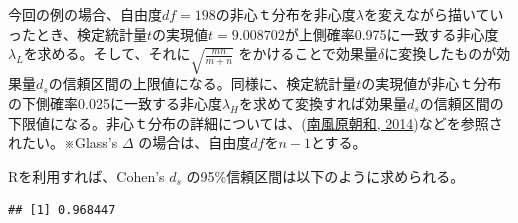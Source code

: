 \documentclass[
  ja=standard, xelatex, base=12pt]{bxjsreport}
\newenvironment{Shaded}{\begin{snugshade}}{\end{snugshade}}
\newcommand{\AttributeTok}[1]{\textcolor[rgb]{0.77,0.63,0.00}{#1}}
\newcommand{\CommentTok}[1]{\textcolor[rgb]{0.56,0.35,0.01}{\textit{#1}}}
\newcommand{\DecValTok}[1]{\textcolor[rgb]{0.00,0.00,0.81}{#1}}
\newcommand{\FunctionTok}[1]{\textcolor[rgb]{0.00,0.00,0.00}{#1}}
\newcommand{\NormalTok}[1]{#1}
\newcommand{\OtherTok}[1]{\textcolor[rgb]{0.56,0.35,0.01}{#1}}
\newcommand{\SpecialCharTok}[1]{\textcolor[rgb]{0.00,0.00,0.00}{#1}}
\begin{document}
今回の例の場合、自由度\(df=198\)の非心ｔ分布を非心度\(λ\)を変えながら描いていったとき、検定統計量\(t\)の実現値\(t=9.008702\)が上側確率0.975に一致する非心度\(λ_L\)を求める。そして、それに\(\sqrt{\frac{mn}{m+n}}\) をかけることで効果量\(\delta\)に変換したものが効果量\(d_s\)の信頼区間の上限値になる。同様に、検定統計量\(t\)の実現値が非心ｔ分布の下側確率0.025に一致する非心度\(λ_H\)を求めて変換すれば効果量\(d_s\)の信頼区間の下限値になる。非心ｔ分布の詳細については、(\protect\hyperlink{ref-haebara2014}{南風原朝和, 2014})などを参照されたい。※Glass's \(\Delta\) の場合は、自由度\(df\)を\(n-1\)とする。

Rを利用すれば、Cohen's \(d_s\) の95\%信頼区間は以下のように求められる。

\begin{Shaded}
\end{Shaded}

\begin{verbatim}
## [1] 0.968447
\end{verbatim}

\begin{Shaded}
\end{Shaded}
\end{document}
